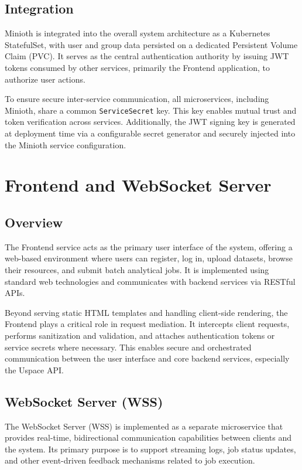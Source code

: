 \subsection{Integration}

Minioth is integrated into the overall system architecture as a Kubernetes StatefulSet, with user and group data persisted on a dedicated Persistent Volume Claim (PVC). It serves as the central authentication authority by issuing JWT tokens consumed by other services, primarily the Frontend application, to authorize user actions.

To ensure secure inter-service communication, all microservices, including Minioth, share a common \texttt{ServiceSecret} key. This key enables mutual trust and token verification across services. Additionally, the JWT signing key is generated at deployment time via a configurable secret generator and securely injected into the Minioth service configuration.


\newpage

\section{Frontend and WebSocket Server}
\label{sec:frontend-wss}

\subsection{Overview}

The Frontend service acts as the primary user interface of the system, offering a web-based environment where users can register, log in, upload datasets, browse their resources, and submit batch analytical jobs. It is implemented using standard web technologies and communicates with backend services via RESTful APIs.

Beyond serving static HTML templates and handling client-side rendering, the Frontend plays a critical role in request mediation. It intercepts client requests, performs sanitization and validation, and attaches authentication tokens or service secrets where necessary. This enables secure and orchestrated communication between the user interface and core backend services, especially the Uspace API.

\subsection{WebSocket Server (WSS)}

The WebSocket Server (WSS) is implemented as a separate microservice that provides real-time, bidirectional communication capabilities between clients and the system. Its primary purpose is to support streaming logs, job status updates, and other event-driven feedback mechanisms related to job execution.

